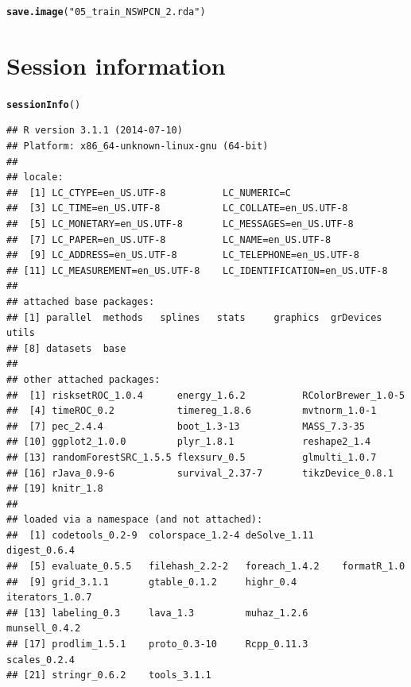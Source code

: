 \documentclass{article}\usepackage[]{graphicx}\usepackage[]{color}
\makeatletter
\newcommand{\hlstr}[1]{\textcolor[rgb]{0.192,0.494,0.8}{#1}}%
\newcommand{\hlstd}[1]{\textcolor[rgb]{0.345,0.345,0.345}{#1}}%
\newcommand{\hlkwd}[1]{\textcolor[rgb]{0.737,0.353,0.396}{\textbf{#1}}}%
\newenvironment{kframe}{%
 \def\at@end@of@kframe{}%
 \ifinner\ifhmode%
  \def\at@end@of@kframe{\end{minipage}}%
  \begin{minipage}{\columnwidth}%
 \fi\fi%
 \def\FrameCommand##1{\hskip\@totalleftmargin \hskip-\fboxsep
 \colorbox{shadecolor}{##1}\hskip-\fboxsep
     \hskip-\linewidth \hskip-\@totalleftmargin \hskip\columnwidth}%
 \MakeFramed {\advance\hsize-\width
   \@totalleftmargin\z@ \linewidth\hsize
   \@setminipage}}%
 {\par\unskip\endMakeFramed%
 \at@end@of@kframe}
\newenvironment{knitrout}{}{} %
\makeatother
\begin{document}
\begin{knitrout}
\color{fgcolor}\begin{kframe}
\begin{alltt}
\hlkwd{save.image}\hlstd{(}\hlstr{"05_train_NSWPCN_2.rda"}\hlstd{)}
\end{alltt}
\end{kframe}
\end{knitrout}

\section{Session information}
\begin{knitrout}
\color{fgcolor}\begin{kframe}
\begin{alltt}
\hlkwd{sessionInfo}\hlstd{()}
\end{alltt}
\begin{verbatim}
## R version 3.1.1 (2014-07-10)
## Platform: x86_64-unknown-linux-gnu (64-bit)
## 
## locale:
##  [1] LC_CTYPE=en_US.UTF-8          LC_NUMERIC=C                 
##  [3] LC_TIME=en_US.UTF-8           LC_COLLATE=en_US.UTF-8       
##  [5] LC_MONETARY=en_US.UTF-8       LC_MESSAGES=en_US.UTF-8      
##  [7] LC_PAPER=en_US.UTF-8          LC_NAME=en_US.UTF-8          
##  [9] LC_ADDRESS=en_US.UTF-8        LC_TELEPHONE=en_US.UTF-8     
## [11] LC_MEASUREMENT=en_US.UTF-8    LC_IDENTIFICATION=en_US.UTF-8
## 
## attached base packages:
## [1] parallel  methods   splines   stats     graphics  grDevices utils    
## [8] datasets  base     
## 
## other attached packages:
##  [1] risksetROC_1.0.4      energy_1.6.2          RColorBrewer_1.0-5   
##  [4] timeROC_0.2           timereg_1.8.6         mvtnorm_1.0-1        
##  [7] pec_2.4.4             boot_1.3-13           MASS_7.3-35          
## [10] ggplot2_1.0.0         plyr_1.8.1            reshape2_1.4         
## [13] randomForestSRC_1.5.5 flexsurv_0.5          glmulti_1.0.7        
## [16] rJava_0.9-6           survival_2.37-7       tikzDevice_0.8.1     
## [19] knitr_1.8            
## 
## loaded via a namespace (and not attached):
##  [1] codetools_0.2-9  colorspace_1.2-4 deSolve_1.11     digest_0.6.4    
##  [5] evaluate_0.5.5   filehash_2.2-2   foreach_1.4.2    formatR_1.0     
##  [9] grid_3.1.1       gtable_0.1.2     highr_0.4        iterators_1.0.7 
## [13] labeling_0.3     lava_1.3         muhaz_1.2.6      munsell_0.4.2   
## [17] prodlim_1.5.1    proto_0.3-10     Rcpp_0.11.3      scales_0.2.4    
## [21] stringr_0.6.2    tools_3.1.1
\end{verbatim}
\end{kframe}
\end{knitrout}
\end{document}
